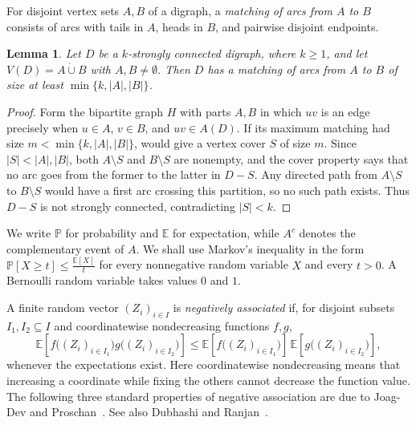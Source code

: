\documentclass[11pt,a4paper]{article}
\newtheorem{lemma}[lemma]{Lemma}
\theoremstyle{remark}
\numberwithin{equation}{section}
\newcommand{\Prob}{\mathbb{P}}
\newcommand{\E}{\mathbb{E}}
\begin{document}
	For disjoint vertex sets $A,B$ of a digraph, a \emph{matching of arcs from $A$ to $B$} consists of
	arcs with tails in $A$, heads in $B$, and pairwise disjoint endpoints.
	\begin{lemma}\label{lem:cutmatching}
		Let $D$ be a $k$-strongly connected digraph, where $k\ge1$, and let $V(D)=A\mathbin{\dot\cup}B$ with
		$A,B\ne\emptyset$.
		Then $D$ has a matching of arcs from $A$ to $B$ of size at least $\min\{k,|A|,|B|\}$.
	\end{lemma}
	\begin{proof}
		Form the bipartite graph $H$ with parts $A,B$ in which $uv$ is an edge precisely when $u\in A$,
		$v\in B$, and $uv\in A(D)$.
		If its maximum matching had size
		$m<\min\{k,|A|,|B|\}$,  would give a
		vertex cover $S$ of size $m$.
		Since $|S|<|A|,|B|$, both $A\setminus S$ and $B\setminus S$ are nonempty, and the cover property
		says that no arc goes from the former to the latter in $D-S$.
		Any directed path from $A\setminus S$ to $B\setminus S$ would have a first arc crossing this
		partition, so no such path exists.
		Thus $D-S$ is not strongly connected, contradicting $|S|<k$.
	\end{proof}
	
	We write $\Prob$ for probability and $\E$ for expectation,
	while $A^c$ denotes the complementary event of $A$.
	We shall use Markov's inequality in the form
	$
	\Prob[X\ge t]\le\frac{\E[X]}{t}
	$
	for every nonnegative random variable $X$ and every $t>0$.
	A Bernoulli random variable takes values $0$ and $1$.
	
	A finite random vector $(Z_i)_{i\in I}$ is
	\emph{negatively associated} if, for disjoint subsets
	$I_1,I_2\subseteq I$ and coordinatewise nondecreasing
	functions $f,g$,
	\[
	\E\!\left[
	f\bigl((Z_i)_{i\in I_1}\bigr)
	g\bigl((Z_i)_{i\in I_2}\bigr)
	\right]
	\le
	\E\!\left[f\bigl((Z_i)_{i\in I_1}\bigr)\right]\,
	\E\!\left[g\bigl((Z_i)_{i\in I_2}\bigr)\right],
	\]
	whenever the expectations exist.
	Here coordinatewise nondecreasing means that increasing
	a coordinate while fixing the others cannot decrease
	the function value.
	The following three standard properties of negative
	association are due to Joag-Dev and Proschan~\cite{JDP}.
	See also Dubhashi and Ranjan~\cite{DR}.
	
\end{document}
